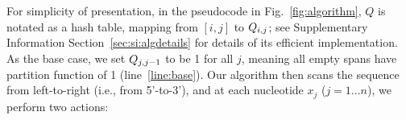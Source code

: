 

For simplicity of presentation,
in the pseudocode in Fig.~\ref{fig:algorithm}, $Q$ is notated as a hash table,
mapping from  $[i,j]$ to %
$Q_{{{i}}, {{j}}}$;
see Supplementary Information Section~\ref{sec:si:algdetails} for details
of its efficient implementation. %
As the base case, we set $Q_{{{j}}, {{j-1}}}$ to be 1 for all $j$,
meaning all empty spans have partition function of 1 (line~\ref{line:base}).
Our algorithm then scans the sequence from left-to-right (i.e., from 5'-to-3'),
and at each nucleotide $x_j$ ($j=1...n$), %
we perform two actions: %
